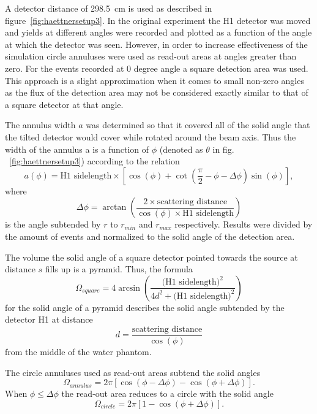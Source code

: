 A detector distance of 298.5~cm is used as described in figure~\ref{fig:haettnersetup3}. In the original experiment the H1 detector was moved and yields at different angles were recorded and plotted as a function of the angle at which the detector was seen. However, in order to increase effectiveness of the simulation circle annuluses were used as read-out areas at angles greater than zero. For the events recorded at 0 degree angle a square detection area was used. This approach is a slight approximation when it comes to small non-zero angles as the flux of the detection area may not be considered exactly similar to that of a square detector at that angle.

The annulus width $a$ was determined so that it covered all of the solid angle that the tilted detector would cover while rotated around the beam axis. Thus the width of the annulus a is a function of $\phi$ (denoted as $\theta$ in fig. ~\ref{fig:haettnersetup3}) according to the relation \begin{equation}a(\phi) = \text{H1 sidelength} \times [\cos(\phi)+ \cot(\frac{\pi}{2} - \phi - \Delta\phi)\sin(\phi)],\end{equation}where \begin{equation}\Delta\phi = \arctan(\frac{2 \times \text{scattering distance}}{\cos(\phi) \times \text{H1 sidelength}})\end{equation} is the angle subtended by $r$ to $r_{min}$ and $r_{max}$ respectively.
Results were divided by the amount of events and normalized to the solid angle of the detection area.

The volume the solid angle of a square detector pointed towards the source at distance $s$ fills up is a pyramid. Thus, the formula \begin{equation}\Omega_{square} = 4 \arcsin(\frac{\text{(H1 sidelength)}^2}{4d^2+\text{(H1 sidelength)}^2})\end{equation}for the solid angle of a pyramid describes the solid angle subtended by the detector H1 at distance \begin{equation}d = \frac{\text{scattering distance}}{\cos(\phi)}\end{equation}from the middle of the water phantom.

The circle annuluses used as read-out areas subtend the solid angles \begin{equation}\Omega_{annulus} = 2 \pi [\cos(\phi - \Delta\phi) - \cos(\phi + \Delta\phi)].\end{equation}When $\phi \le \Delta\phi$ the read-out area reduces to a circle with the solid angle \begin{equation}\Omega_{circle} = 2 \pi [1 - \cos(\phi + \Delta\phi)].\end{equation}

